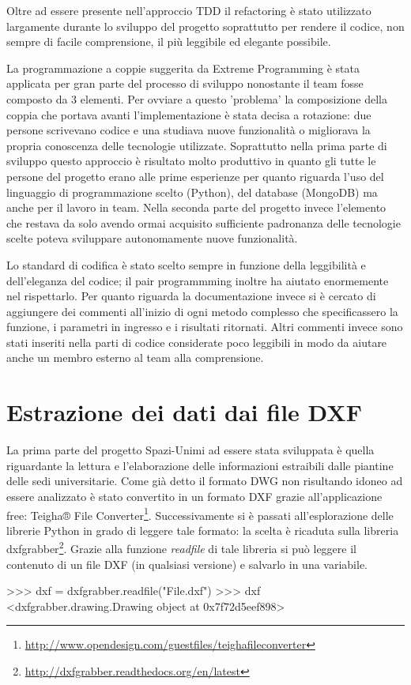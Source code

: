 \documentclass[12pt]{report}
\begin{document}
Oltre ad essere presente nell'approccio TDD il refactoring è stato utilizzato largamente durante lo sviluppo del progetto soprattutto per rendere il codice, non sempre di facile comprensione, il più leggibile ed elegante possibile.

La programmazione a coppie suggerita da Extreme Programming è stata applicata per gran parte del processo di sviluppo nonostante il team fosse composto da 3 elementi. Per ovviare a questo 'problema' la composizione della coppia che portava avanti l'implementazione è stata decisa a rotazione: due persone scrivevano codice e una studiava nuove funzionalità o migliorava la propria conoscenza delle tecnologie utilizzate. Soprattutto nella prima parte di sviluppo questo approccio è risultato molto produttivo in quanto gli tutte le persone del progetto erano alle prime esperienze per quanto riguarda l'uso del linguaggio di programmazione scelto (Python), del database (MongoDB) ma anche per il lavoro in team. Nella seconda parte del progetto invece l'elemento che restava da solo avendo ormai acquisito sufficiente padronanza delle tecnologie scelte poteva sviluppare autonomamente nuove funzionalità.

Lo standard di codifica è stato scelto sempre in funzione della leggibilità e dell'eleganza del codice; il pair programmming inoltre ha aiutato enormemente nel rispettarlo. Per quanto riguarda la documentazione invece si è cercato di aggiungere dei commenti all'inizio di ogni metodo complesso che specificassero la funzione, i parametri in ingresso e i risultati ritornati. Altri commenti invece sono stati inseriti nella parti di codice considerate poco leggibili in modo da aiutare anche un membro esterno al team alla comprensione.   

\newpage
\section{Estrazione dei dati dai file DXF}

La prima parte del progetto Spazi-Unimi ad essere stata sviluppata è quella riguardante la lettura e l'elaborazione delle informazioni estraibili dalle piantine delle sedi universitarie. Come già detto il formato DWG non risultando idoneo ad essere analizzato è stato convertito in un formato DXF grazie all'applicazione free: Teigha® File Converter\footnote{\url{http://www.opendesign.com/guestfiles/teighafileconverter}}. 
Successivamente si è passati all'esplorazione delle librerie Python in grado di leggere tale formato: la scelta è ricaduta sulla libreria dxfgrabber\footnote{\url{http://dxfgrabber.readthedocs.org/en/latest}}. Grazie alla funzione \textit{readfile} di tale libreria si può leggere il contenuto di un file DXF (in qualsiasi versione) e salvarlo in una variabile.
\begin{python}[title=Lettura di un file DXF con dxfgrabber, frame=single]
>>> dxf = dxfgrabber.readfile("File.dxf")
>>> dxf
<dxfgrabber.drawing.Drawing object at 0x7f72d5eef898>
\end{python}
\end{document}
